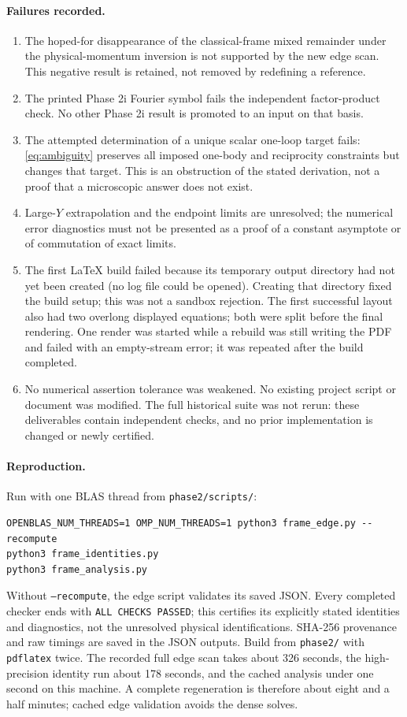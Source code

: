 \documentclass[11pt,a4paper]{article}
\begin{document}
\paragraph{Failures recorded.}
\begin{enumerate}
\item The hoped-for disappearance of the classical-frame mixed remainder
under the physical-momentum inversion is not supported by the new edge
scan. This negative result is retained, not removed by redefining a reference.
\item The printed Phase 2i Fourier symbol fails the independent factor-product
check. No other Phase 2i result is promoted to an input on that basis.
\item The attempted determination of a unique scalar one-loop target fails:
\eqref{eq:ambiguity} preserves all imposed one-body and reciprocity constraints
but changes that target. This is an obstruction of the stated derivation,
not a proof that a microscopic answer does not exist.
\item Large-$Y$ extrapolation and the endpoint limits are unresolved; the
numerical error diagnostics must not be presented as a proof of a constant
asymptote or of commutation of exact limits.
\item The first LaTeX build failed because its temporary output directory had not yet been created (no log file could be opened). Creating that directory fixed the build setup; this was not a sandbox rejection. The first successful layout also had two overlong displayed equations; both were split before the final rendering. One render was started while a rebuild was still writing the PDF and failed with an empty-stream error; it was repeated after the build completed.
\item No numerical assertion tolerance was weakened. No existing project
script or document was modified. The full historical suite was not rerun:
these deliverables contain independent checks, and no prior implementation
is changed or newly certified.
\end{enumerate}

\paragraph{Reproduction.}
Run with one BLAS thread from \texttt{phase2/scripts/}:
\begin{verbatim}
OPENBLAS_NUM_THREADS=1 OMP_NUM_THREADS=1 python3 frame_edge.py --recompute
python3 frame_identities.py
python3 frame_analysis.py
\end{verbatim}
Without \texttt{--recompute}, the edge script validates its saved JSON.
Every completed checker ends with \texttt{ALL CHECKS PASSED}; this certifies
its explicitly stated identities and diagnostics, not the unresolved physical
identifications. SHA-256 provenance and raw timings are saved in the JSON
outputs. Build from \texttt{phase2/} with \texttt{pdflatex} twice.
The recorded full edge scan takes about 326 seconds, the high-precision identity run about 178 seconds, and the cached analysis under one second on this machine. A complete regeneration is therefore about eight and a half minutes; cached edge validation avoids the dense solves.
\end{document}
